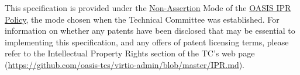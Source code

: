 This specification is provided under the
\href{https://www.oasis-open.org/policies-guidelines/ipr#Non-Assertion-Mode}{Non-Assertion} Mode of the
\href{https://www.oasis-open.org/policies-guidelines/ipr}{OASIS IPR Policy}, the
mode chosen when the Technical Committee was established. For information on
whether any patents have been disclosed that may be essential to implementing
this specification, and any offers of patent licensing terms, please refer to
the Intellectual Property Rights section of the TC's web page
(\url{https://github.com/oasis-tcs/virtio-admin/blob/master/IPR.md}).
